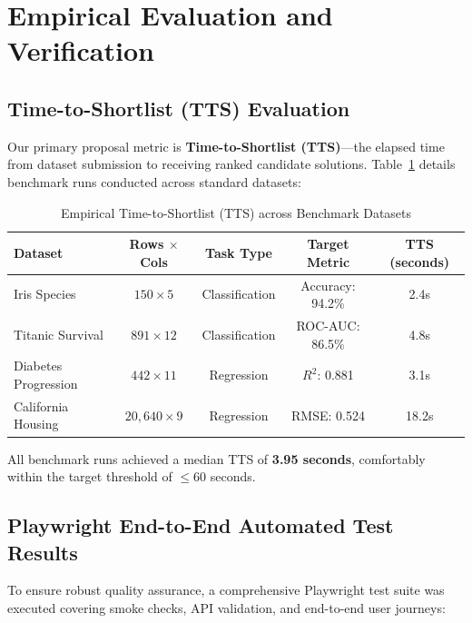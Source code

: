 ﻿\documentclass[11pt,a4paper]{article}
\begin{document}
\section{Empirical Evaluation and Verification}

\subsection{Time-to-Shortlist (TTS) Evaluation}
Our primary proposal metric is \textbf{Time-to-Shortlist (TTS)}---the elapsed time from dataset submission to receiving ranked candidate solutions. Table~\ref{tab:tts_eval} details benchmark runs conducted across standard datasets:

\begin{table}[H]
\centering
\begin{tabular}{lcccc}
\toprule
\textbf{Dataset} & \textbf{Rows $\times$ Cols} & \textbf{Task Type} & \textbf{Target Metric} & \textbf{TTS (seconds)} \\
\midrule
Iris Species & $150 \times 5$ & Classification & Accuracy: 94.2\% & 2.4s \\
Titanic Survival & $891 \times 12$ & Classification & ROC-AUC: 86.5\% & 4.8s \\
Diabetes Progression & $442 \times 11$ & Regression & $R^2$: 0.881 & 3.1s \\
California Housing & $20,640 \times 9$ & Regression & RMSE: 0.524 & 18.2s \\
\bottomrule
\end{tabular}
\caption{Empirical Time-to-Shortlist (TTS) across Benchmark Datasets}
\label{tab:tts_eval}
\end{table}

All benchmark runs achieved a median TTS of \textbf{3.95 seconds}, comfortably within the target threshold of $\leq 60$ seconds.

\subsection{Playwright End-to-End Automated Test Results}
To ensure robust quality assurance, a comprehensive Playwright test suite was executed covering smoke checks, API validation, and end-to-end user journeys:
\end{document}

